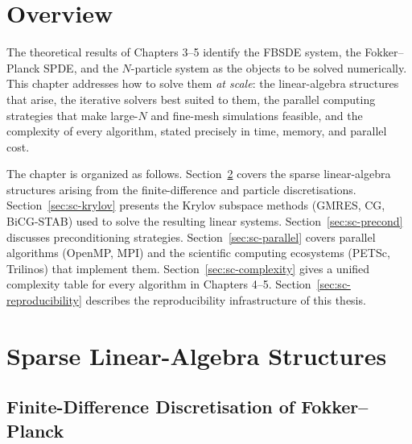 
\section{Overview}

The theoretical results of Chapters 3--5 identify the FBSDE system, the
Fokker--Planck SPDE, and the $N$-particle system as the objects to be solved
numerically. This chapter addresses how to solve them \emph{at scale}: the
linear-algebra structures that arise, the iterative solvers best suited to them,
the parallel computing strategies that make large-$N$ and fine-mesh simulations
feasible, and the complexity of every algorithm, stated precisely in time, memory,
and parallel cost.

The chapter is organized as follows. Section~\ref{sec:sc-linalg} covers the
sparse linear-algebra structures arising from the finite-difference and particle
discretisations. Section~\ref{sec:sc-krylov} presents the Krylov subspace methods
(GMRES, CG, BiCG-STAB) used to solve the resulting linear systems. Section~\ref{sec:sc-precond}
discusses preconditioning strategies. Section~\ref{sec:sc-parallel} covers
parallel algorithms (OpenMP, MPI) and the scientific computing ecosystems
(PETSc, Trilinos) that implement them. Section~\ref{sec:sc-complexity} gives a
unified complexity table for every algorithm in Chapters 4--5.
Section~\ref{sec:sc-reproducibility} describes the reproducibility infrastructure
of this thesis.

\section{Sparse Linear-Algebra Structures}
\label{sec:sc-linalg}

\subsection{Finite-Difference Discretisation of Fokker--Planck}

